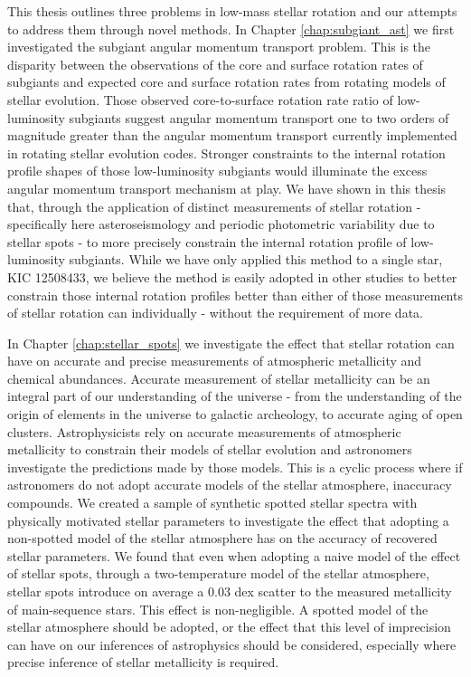 This thesis outlines three problems in low-mass stellar rotation and our attempts to address them through novel methods.
In Chapter \ref{chap:subgiant_ast} we first investigated the subgiant angular momentum transport problem.
This is the disparity between the observations of the core and surface rotation rates of subgiants and expected core and surface rotation rates from rotating models of stellar evolution.
Those observed core-to-surface rotation rate ratio of low-luminosity subgiants suggest angular momentum transport one to two orders of magnitude greater than the angular momentum transport currently implemented in rotating stellar evolution codes.
Stronger constraints to the internal rotation profile shapes of those low-luminosity subgiants would illuminate the excess angular momentum transport mechanism at play.
We have shown in this thesis that, through the application of distinct measurements of stellar rotation - specifically here asteroseismology and periodic photometric variability due to stellar spots - to more precisely constrain the internal rotation profile of low-luminosity subgiants.
While we have only applied this method to a single star, KIC 12508433, we believe the method is easily adopted in other studies to better constrain those internal rotation profiles better than either of those measurements of stellar rotation can individually - without the requirement of more data.

In Chapter \ref{chap:stellar_spots} we investigate the effect that stellar rotation can have on accurate and precise measurements of atmospheric metallicity and chemical abundances.
Accurate measurement of stellar metallicity can be an integral part of our understanding of the universe - from the understanding of the origin of elements in the universe to galactic archeology, to accurate aging of open clusters.
Astrophysicists rely on accurate measurements of atmospheric metallicity to constrain their models of stellar evolution and astronomers investigate the predictions made by those models.
This is a cyclic process where if astronomers do not adopt accurate models of the stellar atmosphere, inaccuracy compounds.
We created a sample of synthetic spotted stellar spectra with physically motivated stellar parameters to investigate the effect that adopting a non-spotted model of the stellar atmosphere has on the accuracy of recovered stellar parameters.
We found that even when adopting a naive model of the effect of stellar spots, through a two-temperature model of the stellar atmosphere, stellar spots introduce on average a 0.03 dex scatter to the measured metallicity of main-sequence stars.
This effect is non-negligible. 
A spotted model of the stellar atmosphere should be adopted, or the effect that this level of imprecision can have on our inferences of astrophysics should be considered, especially where precise inference of stellar metallicity is required.

